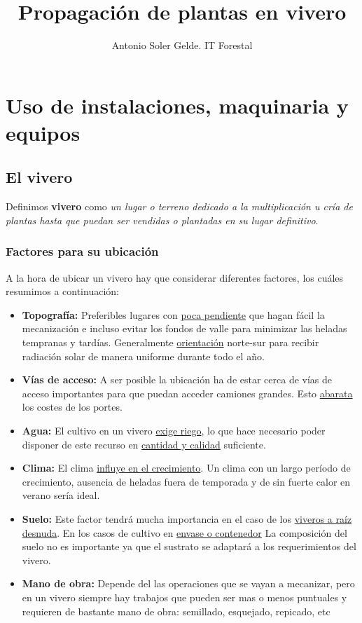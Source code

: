 \documentclass[a4paper,12pt,oneside]{article}
\author{Antonio Soler Gelde. IT Forestal}
\date{}
\title{Propagación de plantas en vivero}
\begin{document}
\maketitle
\tableofcontents


\section{Uso de instalaciones, maquinaria y equipos}
\label{sec:orgcd55230}
\subsection{El vivero}
\label{sec:org1f22cdc}
Definimos \textbf{vivero} como \emph{un lugar o terreno dedicado a la multiplicación u cría
de plantas hasta que puedan ser vendidas o plantadas en su lugar definitivo}. 
\subsubsection{Factores para su ubicación}
\label{sec:org9b26fd6}
A la hora de ubicar un vivero hay que considerar diferentes factores, los cuáles
resumimos a continuación:
\begin{itemize}
\item \textbf{Topografía:} Preferibles lugares con \uline{poca pendiente} que hagan fácil la
mecanización e incluso evitar los  fondos de valle para minimizar las heladas
tempranas y tardías. Generalmente \uline{orientación} norte-sur para recibir
radiación solar de manera uniforme durante todo el año.
\item \textbf{Vías de acceso:} A ser posible la ubicación ha de estar cerca de vías de
acceso importantes para que puedan acceder camiones grandes. Esto \uline{abarata}
los costes de los portes.
\item \textbf{Agua:} El cultivo en un vivero \uline{exige riego}, lo que hace necesario poder
disponer de este recurso en \uline{cantidad y calidad} suficiente.
\item \textbf{Clima:} El clima \uline{influye en el crecimiento}. Un clima con un largo período de
crecimiento, ausencia de heladas fuera de temporada y de sin fuerte calor en
verano sería ideal.
\item \textbf{Suelo:} Este factor tendrá mucha importancia en el caso de los \uline{viveros a
raíz desnuda}. En los casos de cultivo en \uline{envase o contenedor} La composición
del suelo no es importante ya que el sustrato se adaptará a los
requerimientos del vivero.
\item \textbf{Mano de obra:} Depende del las operaciones que se vayan a mecanizar, pero en
un vivero siempre hay trabajos que pueden ser mas o menos puntuales y
requieren  de bastante mano de obra: semillado, esquejado, repicado, etc
\end{itemize}
\end{document}
